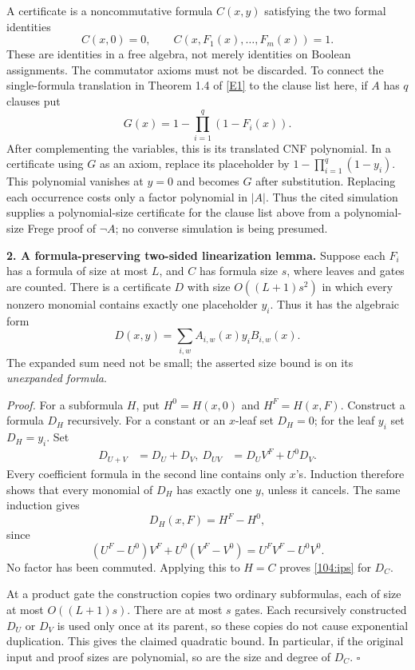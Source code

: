 \documentclass[11pt,a4paper]{article}
\newcommand{\eref}[2]{\hyperlink{extra:#1:#2}{[E#2]}}
\numberwithin{equation}{section}
\begin{document}
A certificate is a noncommutative formula $C(x,y)$ satisfying the two formal
identities
\begin{equation}\label{104:ips}
 C(x,0)=0,\qquad C(x,F_1(x),\ldots,F_m(x))=1.
\end{equation}
These are identities in a free algebra, not merely identities on Boolean
assignments. The commutator axioms must not be discarded. To connect the
single-formula translation in Theorem 1.4 of \eref{104}{1} to the clause
list here, if $A$ has $q$ clauses put
\[
 G(x)=1-\prod_{i=1}^{q}(1-F_i(x)).
\]
After complementing the variables, this is its translated CNF polynomial.
In a certificate using $G$ as an axiom, replace its placeholder by
$1-\prod_{i=1}^{q}(1-y_i)$. This polynomial vanishes at $y=0$ and becomes
$G$ after substitution. Replacing each occurrence costs only a factor
polynomial in $|A|$. Thus the cited simulation supplies a polynomial-size
certificate for the clause list above from a polynomial-size Frege proof
of $\neg A$; no converse simulation is being presumed.

\medskip
\textbf{2. A formula-preserving two-sided linearization lemma.}
Suppose each $F_i$ has a formula of size at most $L$, and $C$ has formula size
$s$, where leaves and gates are counted. There is a certificate $D$ with
size $O((L+1)s^2)$ in which every nonzero monomial contains exactly one
placeholder $y_i$. Thus it has the algebraic form
\begin{equation}\label{104:two-sided}
 D(x,y)=\sum_{i,w} A_{i,w}(x)y_iB_{i,w}(x).
\end{equation}
The expanded sum need not be small; the asserted size bound is on its
\emph{unexpanded formula}.

\emph{Proof.} For a subformula $H$, put $H^0=H(x,0)$ and $H^F=H(x,F)$.
Construct a formula $D_H$ recursively. For a constant or an $x$-leaf set
$D_H=0$; for the leaf $y_i$ set $D_H=y_i$. Set
\begin{align}
 D_{U+V}&=D_U+D_V,\
 D_{UV}&=D_U V^F+U^0D_V. \label{104:product}
\end{align}
Every coefficient formula in the second line contains only $x$'s. Induction
therefore shows that every monomial of $D_H$ has exactly one $y$, unless
it cancels. The same induction gives
\[
 D_H(x,F)=H^F-H^0,
\]
since
\[
 (U^F-U^0)V^F+U^0(V^F-V^0)=U^FV^F-U^0V^0.
\]
No factor has been commuted. Applying this to $H=C$ proves
\eqref{104:ips} for $D_C$.

At a product gate the construction copies two ordinary subformulas, each
of size at most $O((L+1)s)$. There are at most $s$ gates. Each recursively
constructed $D_U$ or $D_V$ is used only once at its parent, so these copies
do not cause exponential duplication. This gives the claimed quadratic
bound. In particular, if the original input and proof sizes are polynomial,
so are the size and degree of $D_C$. $\square$
\end{document}
